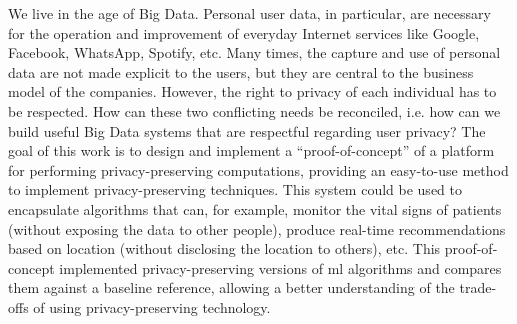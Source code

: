 We live in the age of Big Data. Personal user data, in particular, are necessary for the operation and improvement of everyday Internet services like Google, Facebook, WhatsApp, Spotify, etc. Many times, the capture and use of personal data are not made explicit to the users, but they are central to the business model of the companies. However, the right to privacy of each individual has to be respected.
How can these two conflicting needs be reconciled, i.e. how can we build useful Big Data systems that are respectful regarding user privacy?
The goal of this work is to design and implement a ``proof-of-concept'' of a platform for performing privacy-preserving computations, providing an easy-to-use method to implement privacy-preserving techniques. This system could be used to encapsulate algorithms that can, for example, monitor the vital signs of patients (without exposing the data to other people), produce real-time recommendations based on location (without disclosing the location to others), etc.
This proof-of-concept implemented privacy-preserving versions of \ac{ml} algorithms and compares them against a baseline reference, allowing a better understanding of the trade-offs of using privacy-preserving technology.

\newpage
